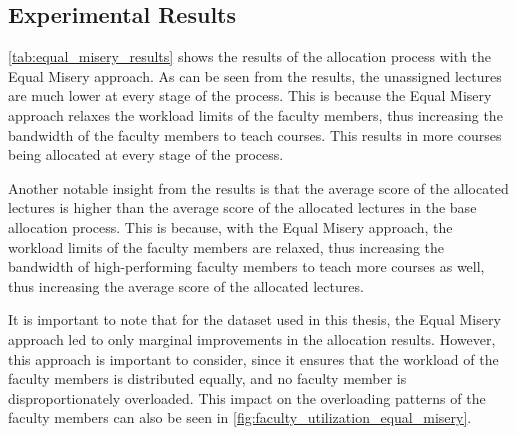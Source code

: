 \subsection{Experimental Results}


\begin{table}[H]
  \centering
  \caption{Experimental Results of Equal Misery}
  \label{tab:equal_misery_results}
\end{table}

\autoref{tab:equal_misery_results} shows the results of the allocation process with the Equal Misery approach. As can be seen from the results, the unassigned lectures are much lower at every stage of the process. This is because the Equal Misery approach relaxes the workload limits of the faculty members, thus increasing the bandwidth of the faculty members to teach courses. This results in more courses being allocated at every stage of the process.

Another notable insight from the results is that the average score of the allocated lectures is higher than the average score of the allocated lectures in the base allocation process. This is because, with the Equal Misery approach, the workload limits of the faculty members are relaxed, thus increasing the bandwidth of high-performing faculty members to teach more courses as well, thus increasing the average score of the allocated lectures.

It is important to note that for the dataset used in this thesis, the Equal Misery approach led to only marginal improvements in the allocation results. However, this approach is important to consider, since it ensures that the workload of the faculty members is distributed equally, and no faculty member is disproportionately overloaded. This impact on the overloading patterns of the faculty members can also be seen in \autoref{fig:faculty_utilization_equal_misery}.

